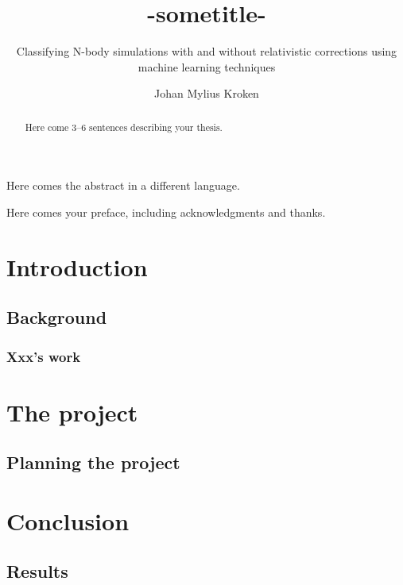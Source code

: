 \documentclass[UKenglish]{old_el_paso/uiomasterthesis}
\title{-sometitle-}        %
\subtitle{Classifying N-body simulations with and without
relativistic corrections using machine learning
techniques}         %
\author{Johan Mylius Kroken}                  %
\begin{document}
\uiomasterfp[dept={Institute of Theoretical Astrophysics},  %
  program={Computational Science: Astrophysics},                        %
  supervisors={A David Fonseca Mota\and B Julian Adamek\and C Francisco Antonio Villaescusa Navarro},
  color=green,     %
  long]                                     %
\frontmatter{}
\begin{abstract}
  Here come 3--6 sentences describing your thesis.
\end{abstract}

\begin{xabstract}[Sammendrag]               %
  Here comes the abstract in a different language.
\end{xabstract}

\tableofcontents{}                          %
\listoffigures{}                            %
\listoftables{}                             %

\begin{preface}
  Here comes your preface, including acknowledgments and thanks.
\end{preface}

\mainmatter{}
\part{Introduction}                   %
\chapter{Background}                  %
\section{Xxx's work}                  %

\part{The project}                    %
\chapter{Planning the project}        %

\part{Conclusion}                     %
\chapter{Results}                     %

\backmatter{}
\end{document}
